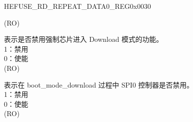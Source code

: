\begin{register}{H}{EFUSE\_RD\_REPEAT\_DATA0\_REG}{0x0030}
\begin{regdesc}
\begin{reglist}
(RO)
\label{fielddesc:EFUSEDISFORCEDOWNLOAD}\item [EFUSE\_DIS\_FORCE\_DOWNLOAD] 表示是否禁用强制芯片进入 Download 模式的功能。\\
1：禁用\\
0：使能\\
(RO)
\label{fielddesc:EFUSESPIDOWNLOADMSPIDIS}\item [EFUSE\_SPI\_DOWNLOAD\_MSPI\_DIS] 表示在 boot\_mode\_download 过程中 SPI0 控制器是否禁用。\\
1：禁用\\
0：使能\\
(RO)
\item [见下页……]
\end{reglist}\end{regdesc}
\end{register}
\addtocounter{Regfloat}{-1}

